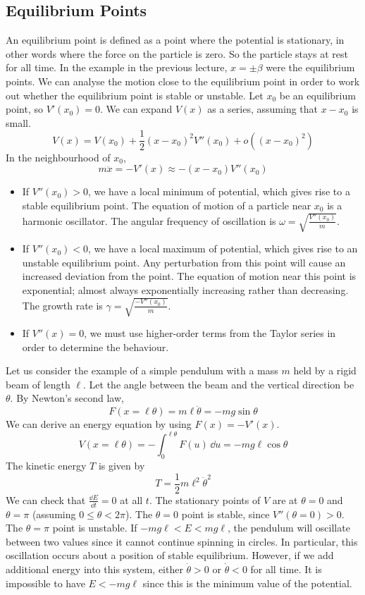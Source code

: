 \documentclass{article}
\begin{document}
\subsection{Equilibrium Points}
An equilibrium point is defined as a point where the potential is stationary, in other words where the force on the particle is zero. So the particle stays at rest for all time. In the example in the previous lecture, $x = \pm \beta$ were the equilibrium points. We can analyse the motion close to the equilibrium point in order to work out whether the equilibrium point is stable or unstable. Let $x_0$ be an equilibrium point, so $V'(x_0) = 0$. We can expand $V(x)$ as a series, assuming that $x-x_0$ is small.
\[ V(x) = V(x_0) + \frac{1}{2}(x-x_0)^2V''(x_0) + o((x-x_0)^2) \]
In the neighbourhood of $x_0$,
\[ m\ddot x = -V'(x) \approx -(x-x_0)V''(x_0) \]
\begin{itemize}
    \item If $V''(x_0) > 0$, we have a local minimum of potential, which gives rise to a stable equilibrium point. The equation of motion of a particle near $x_0$ is a harmonic oscillator. The angular frequency of oscillation is $\omega = \sqrt{\frac{V''(x_0)}{m}}$.
    \item If $V''(x_0) < 0$, we have a local maximum of potential, which gives rise to an unstable equilibrium point. Any perturbation from this point will cause an increased deviation from the point. The equation of motion near this point is exponential; almost always exponentially increasing rather than decreasing. The growth rate is $\gamma = \sqrt{\frac{-V''(x_0)}{m}}$.
    \item If $V''(x) = 0$, we must use higher-order terms from the Taylor series in order to determine the behaviour.
\end{itemize}
Let us consider the example of a simple pendulum with a mass $m$ held by a rigid beam of length $\ell$. Let the angle between the beam and the vertical direction be $\theta$. By Newton's second law,
\[ F(x = \ell \theta) = m \ell \ddot \theta = -mg \sin \theta \]
We can derive an energy equation by using $F(x) = -V'(x)$.
\[ V(x = \ell \theta) = -\int_0^{\ell\theta} F(u) \,\dd u = -mg \ell \cos \theta \]
The kinetic energy $T$ is given by
\[ T = \frac{1}{2}m\ell^2\dot\theta^2 \]
We can check that $\frac{\dd E}{\dd t} = 0$ at all $t$. The stationary points of $V$ are at $\theta = 0$ and $\theta = \pi$ (assuming $0 \leq \theta < 2\pi$). The $\theta=0$ point is stable, since $V''(\theta = 0) > 0$. The $\theta=\pi$ point is unstable. If $-mg\ell < E < mg\ell$, the pendulum will oscillate between two values since it cannot continue spinning in circles. In particular, this oscillation occurs about a position of stable equilibrium. However, if we add additional energy into this system, either $\dot\theta > 0$ or $\dot\theta < 0$ for all time. It is impossible to have $E < -mg\ell$ since this is the minimum value of the potential.
\end{document}
